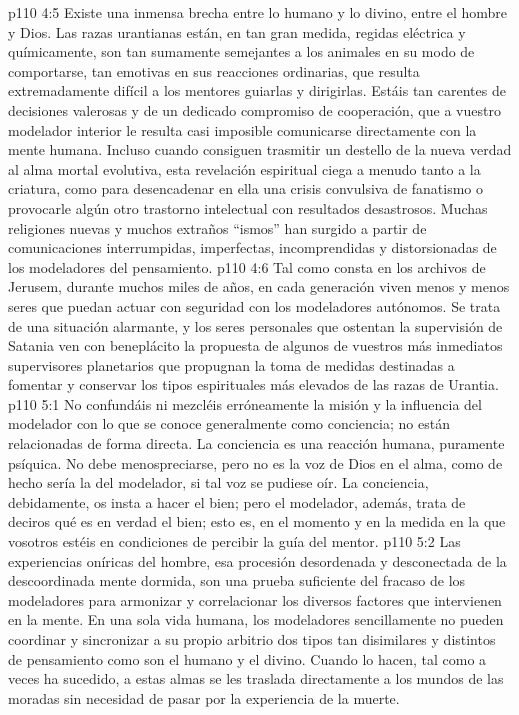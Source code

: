 \vs p110 4:5 \pc Existe una inmensa brecha entre lo humano y lo divino, entre el hombre y Dios. Las razas urantianas están, en tan gran medida, regidas eléctrica y químicamente, son tan sumamente semejantes a los animales en su modo de comportarse, tan emotivas en sus reacciones ordinarias, que resulta extremadamente difícil a los mentores guiarlas y dirigirlas. Estáis tan carentes de decisiones valerosas y de un dedicado compromiso de cooperación, que a vuestro modelador interior le resulta casi imposible comunicarse directamente con la mente humana. Incluso cuando consiguen trasmitir un destello de la nueva verdad al alma mortal evolutiva, esta revelación espiritual ciega a menudo tanto a la criatura, como para desencadenar en ella una crisis convulsiva de fanatismo o provocarle algún otro trastorno intelectual con resultados desastrosos. Muchas religiones nuevas y muchos extraños “ismos” han surgido a partir de comunicaciones interrumpidas, imperfectas, incomprendidas y distorsionadas de los modeladores del pensamiento.
\vs p110 4:6 Tal como consta en los archivos de Jerusem, durante muchos miles de años, en cada generación viven menos y menos seres que puedan actuar con seguridad con los modeladores autónomos. Se trata de una situación alarmante, y los seres personales que ostentan la supervisión de Satania ven con beneplácito la propuesta de algunos de vuestros más inmediatos supervisores planetarios que propugnan la toma de medidas destinadas a fomentar y conservar los tipos espirituales más elevados de las razas de Urantia.
\vs p110 5:1 No confundáis ni mezcléis erróneamente la misión y la influencia del modelador con lo que se conoce generalmente como conciencia; no están relacionadas de forma directa. La conciencia es una reacción humana, puramente psíquica. No debe menospreciarse, pero no es la voz de Dios en el alma, como de hecho sería la del modelador, si tal voz se pudiese oír. La conciencia, debidamente, os insta a hacer el bien; pero el modelador, además, trata de deciros qué es en verdad el bien; esto es, en el momento y en la medida en la que vosotros estéis en condiciones de percibir la guía del mentor.
\vs p110 5:2 \pc Las experiencias oníricas del hombre, esa procesión desordenada y desconectada de la descoordinada mente dormida, son una prueba suficiente del fracaso de los modeladores para armonizar y correlacionar los diversos factores que intervienen en la mente. En una sola vida humana, los modeladores sencillamente no pueden coordinar y sincronizar a su propio arbitrio dos tipos tan disimilares y distintos de pensamiento como son el humano y el divino. Cuando lo hacen, tal como a veces ha sucedido, a estas almas se les traslada directamente a los mundos de las moradas sin necesidad de pasar por la experiencia de la muerte.
